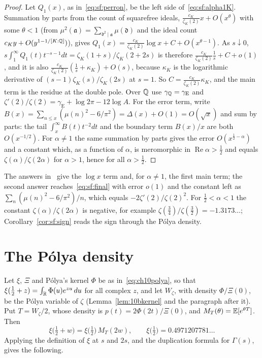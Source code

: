 \begin{proof}
Let $Q_1(x)$, as in~\eqref{eq:sf:perron}, be the left side of~\eqref{eq:sf:alpha1K}. Summation by parts from the count of squarefree ideals, $\frac{c_K}{\zeta_K(2)}x+O(x^\theta)$ with some $\theta<1$ (from $\mu^2(\mathfrak a)=\sum_{\mathfrak d^2\mid\mathfrak a}\mu(\mathfrak d)$ and the ideal count $c_Ky+O(y^{1-1/[K:\mathbb{Q}]})$), gives $Q_1(x)=\frac{c_K}{\zeta_K(2)}\log x+C+O(x^{\theta-1})$. As $s\downarrow0$, $s\int_1^\infty Q_1(t)t^{-s-1}dt=\zeta_K(1+s)/\zeta_K(2+2s)$ is therefore $\frac{c_K}{\zeta_K(2)}\frac1s+C+o(1)$, and it is also $\frac{c_K}{\zeta_K(2)}(\frac1s+\kappa_K)+O(s)$, because $\kappa_K$ is the logarithmic derivative of $(s-1)\zeta_K(s)/\zeta_K(2s)$ at $s=1$. So $C=\frac{c_K}{\zeta_K(2)}\kappa_K$, and the main term is the residue at the double pole. Over $\mathbb{Q}$ use $\gamma_{\mathbb{Q}}=\gamma_{\mathrm E}$ and $\zeta'(2)/\zeta(2)=\gamma_{\mathrm E}+\log2\pi-12\log A$. For the error term, write $B(x)=\sum_{n\le x}(\mu(n)^2-6/\pi^2)=\Delta(x)+O(1)=O(\sqrt x)$ and sum by parts: the tail $\int_x^\infty B(t)t^{-2}dt$ and the boundary term $B(x)/x$ are both $O(x^{-1/2})$. For $\alpha\ne1$ the same summation by parts gives the error $O(x^{\frac12-\alpha})$ and a constant which, as a function of $\alpha$, is meromorphic in $\operatorname{Re}\alpha>\frac12$ and equals $\zeta(\alpha)/\zeta(2\alpha)$ for $\alpha>1$, hence for all $\alpha>\frac12$.
\end{proof}

The answers in~\cite{mathstackexchange2016} give the $\log x$ term and, for $\alpha\ne1$, the first main term; the second answer reaches~\eqref{eq:sf:final} with error $o(1)$ and the constant left as $\sum_n(\mu(n)^2-6/\pi^2)/n$, which equals $-2\zeta'(2)/\zeta(2)^2$. For $\frac12<\alpha<1$ the constant $\zeta(\alpha)/\zeta(2\alpha)$ is negative, for example $\zeta(\frac34)/\zeta(\frac32)=-1.3173\ldots$; Corollary~\ref{cor:sf:sign} reads the sign through the P\'olya density.

\section{The P\'olya density}\label{sec:sf:polya}

Let $\xi$, $\Xi$ and P\'olya's kernel $\Phi$ be as in~\eqref{eq:ch10polya}, so that $\xi(\frac12+z)=\int_{\mathbb{R}}\Phi(u)e^{zu}\,du$ for all complex $z$, and let $W_\zeta$, with density $\Phi/\Xi(0)$, be the P\'olya variable of $\zeta$ (Lemma~\ref{lem:10bkernel} and the paragraph after it). Put $T=W_\zeta/2$, whose density is $p(t)=2\Phi(2t)/\Xi(0)$, and $M_T(\theta)=\mathbb{E}[e^{\theta T}]$. Then
\begin{equation}\label{eq:sf:xiM}
\xi\bigl(\tfrac12+w\bigr)=\xi\bigl(\tfrac12\bigr)\,M_T(2w),\qquad \xi\bigl(\tfrac12\bigr)=0.4971207781\ldots
\end{equation}
Applying the definition of $\xi$ at $s$ and $2s$, and the duplication formula for $\Gamma(s)$, gives the following.

